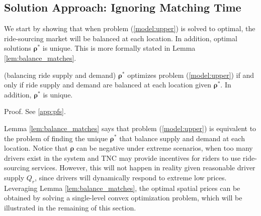 \documentclass[review]{elsarticle}
\begin{document}




\subsection{Solution Approach: Ignoring Matching Time} \label{sec:solu_approach_ignore}
We start by showing that when problem (\ref{model:upper}) is solved to optimal, the ride-sourcing market will be balanced at each location. In addition, optimal solutions $\bm{\rho}^*$ is unique. This is more formally stated in Lemma \ref{lem:balance_matches}.

\begin{lemma}{(balancing ride supply and demand)} \label{lem:balance_matches}
$\bm{\rho}^*$ optimizes problem (\ref{model:upper}) if and only if ride supply and demand are balanced at each location given $\bm{\rho}^*$. In addition, $\bm{\rho}^*$ is unique.
\end{lemma}  

\state Proof. See \ref{app:pfs}. 
\eop

Lemma \ref{lem:balance_matches} says that problem (\ref{model:upper}) is equivalent to the problem of finding the unique $\bm{\rho}^{\ast}$ that balance supply and demand at each location. Notice that $\bm{\rho}$ can be negative under extreme scenarios, when too many drivers exist in the system and TNC may provide incentives for riders to use ride-sourcing services. However, this will not happen in reality given reasonable driver supply $Q_r$, since drivers will dynamically respond to extreme low prices\citep{bimpikis2019spatial}. Leveraging Lemma \ref{lem:balance_matches}, the optimal spatial prices can be obtained by solving a single-level convex optimization problem, which will be illustrated in the remaining of this section. 
\end{document}

